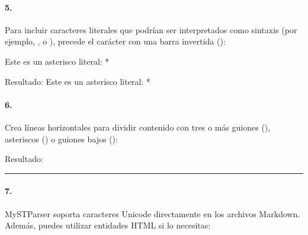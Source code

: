 \documentclass[a4paper,10pt,spanish]{sphinxmanual}
\begin{document}
\paragraph{5. }
\label{\detokenize{configuracion_inicial/013.guia_de_myst_parser:caracter-de-escape}}
\sphinxAtStartPar
Para incluir caracteres literales que podrían ser interpretados como sintaxis (por ejemplo, \sphinxcode{\sphinxupquote{*}}, \sphinxcode{\sphinxupquote{\_}} o \sphinxcode{\sphinxupquote{\textasciitilde{}}}), precede el carácter con una barra invertida (\sphinxcode{\sphinxupquote{\textbackslash{}}}):

\begin{sphinxVerbatim}[commandchars=\\\{\}]
Este es un asterisco literal: \PYGZbs{}*
\end{sphinxVerbatim}

\sphinxAtStartPar
Resultado: Este es un asterisco literal: *


\paragraph{6. }
\label{\detokenize{configuracion_inicial/013.guia_de_myst_parser:separadores-horizontales}}
\sphinxAtStartPar
Crea líneas horizontales para dividir contenido con tres o más guiones (\sphinxcode{\sphinxupquote{\sphinxhyphen{}\sphinxhyphen{}\sphinxhyphen{}}}), asteriscos (\sphinxcode{\sphinxupquote{***}}) o guiones bajos (\sphinxcode{\sphinxupquote{\_\_\_}}):

\begin{sphinxVerbatim}[commandchars=\\\{\}]
\PYGZhy{}\PYGZhy{}\PYGZhy{}
\end{sphinxVerbatim}

\sphinxAtStartPar
Resultado:


\bigskip\hrule\bigskip



\paragraph{7. }
\label{\detokenize{configuracion_inicial/013.guia_de_myst_parser:letras-y-simbolos-especiales}}
\sphinxAtStartPar
MyST\sphinxhyphen{}Parser soporta caracteres Unicode directamente en los archivos Markdown. Además, puedes utilizar entidades HTML si lo necesitas:
\end{document}
